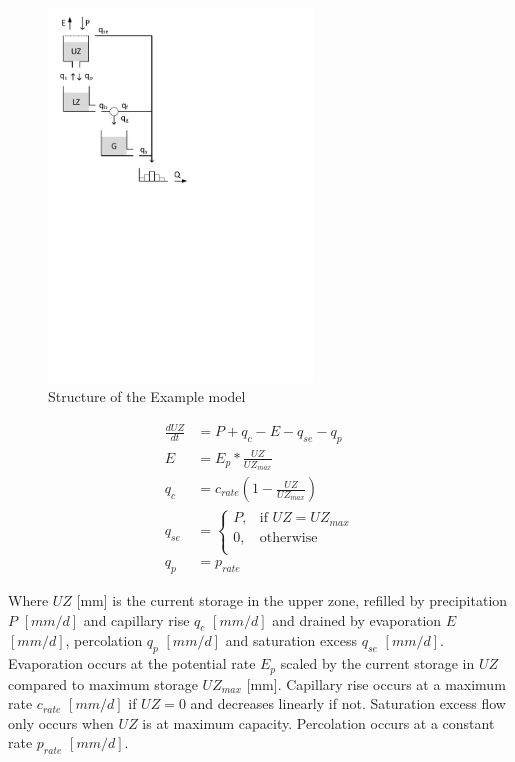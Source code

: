{ 																	%
\begin{figure}
\includegraphics[trim=1cm 16cm 7cm 1cm,width=7cm,keepaspectratio]{./files/nn_schematic.pdf}
\caption{Structure of the Example model} \label{fig:nn_schematic}
\end{figure}

\begin{align}
	\frac{dUZ}{dt} &= P+ q_c -E-q_{se}-q_p \\
	E &= E_p*\frac{UZ}{UZ_{max}}\\
	q_c &= c_{rate}\left(1-\frac{UZ}{UZ_{max}}\right)\\
	q_{se} &= \begin{cases}
		P, &\text{if } UZ = UZ_{max}\\
		0, &\text{otherwise}\\
	\end{cases}	\\
	q_p &= p_{rate}
\end{align}

Where $UZ$ [mm] is the current storage in the upper zone, refilled by precipitation $P$ $[mm/d]$ and capillary rise $q_c$ $[mm/d]$ and drained by evaporation $E$ $[mm/d]$, percolation $q_p$ $[mm/d]$ and saturation excess $q_{se}$ $[mm/d]$.
Evaporation occurs at the potential rate $E_p$ scaled by the current storage in $UZ$ compared to maximum storage $UZ_{max}$ [mm].
Capillary rise occurs at a maximum rate $c_{rate}$ $[mm/d]$ if $UZ=0$ and decreases linearly if not.
Saturation excess flow only occurs when $UZ$ is at maximum capacity.
Percolation occurs at a constant rate $p_{rate}$ $[mm/d]$.

} %


